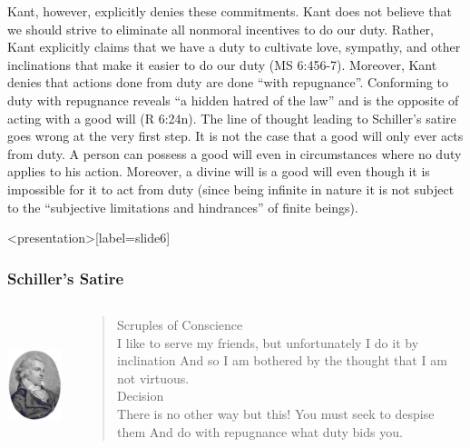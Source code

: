 Kant, however, explicitly denies these commitments. Kant does not believe that we should strive to eliminate all nonmoral incentives to do our duty. Rather, Kant explicitly claims that we have a duty to cultivate love, sympathy, and other inclinations that make it easier to do our duty (MS 6:456-7). Moreover, Kant denies that actions done from duty are done ``with repugnance''. Conforming to duty with repugnance reveals ``a hidden hatred of the law'' and is the opposite of acting with a good will (R 6:24n). The line of thought leading to Schiller's satire goes wrong at the very first step. It is not the case that a good will only ever acts from duty. A person can possess a good will even in circumstances where no duty applies to his action. Moreover, a divine will is a good will even though it is impossible for it to act from duty (since being infinite in nature it is not subject to the ``subjective limitations and hindrances'' of finite beings). \change

% 

\begin{frame}<presentation>[label=slide6]
    \frametitle{Schiller's Satire}
        \begin{columns}
            \begin{column}{3cm}
                \includegraphics[height=4cm]{../../../graphics/schiller.jpg}
            \end{column}
            \begin{column}{7cm}
                \begin{quote}
                    \alert{Scruples of Conscience}\\
                	I like to serve my friends, but unfortunately I do it by inclination And so I am bothered by the thought that I am not virtuous.\\
                	\alert{Decision}\\
                	There is no other way but this! You must seek to despise them And do with repugnance what duty bids you.
                \end{quote}
            \end{column}
        \end{columns}
\end{frame}

